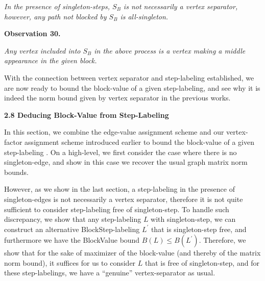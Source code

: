 \emph{In the presence of singleton-steps, $S_{B}$ is not necessarily a vertex separator, however, any path not blocked by $S_{B}$ is all-singleton.}\par







\par\medskip\noindent\textbf{
\textbf{Observation 30}\textbf{.}
}\par



\emph{Any vertex included into $S_{B}$ in the above process is a vertex making a middle appearance in the given block.}\par






With the connection between vertex separator and step-labeling established, we are now ready to bound the block-value of a given step-labeling, and see why it is indeed the norm bound given by vertex separator in the previous works.\par







\par\medskip\noindent\textbf{
2.8 Deducing Block-Value from Step-Labeling}\par




In this section, we combine the edge-value assignment scheme and our vertex-factor assignment scheme introduced earlier to bound the block-value of a given step-labeling
. On a high-level, we first consider the case where there is no singleton-edge, and show in this case we recover the usual graph matrix norm bounds.\par




However, as we show in the last section, a step-labeling in the presence of singleton-edges is not necessarily a vertex separator, therefore it is not quite sufficient to consider step-labeling free of singleton-step. To handle such discrepancy, we show that any step-labeling $L$ with singleton-step, we can construct an alternative BlockStep-labeling $L^{\prime}$ that is singleton-step free, and furthermore we have the BlockValue bound $B(L)\leq B(L^{\prime})$. Therefore, we show that for the sake of maximizer of the block-value (and thereby of the matrix norm bound), it suffices for us to consider $L$ that is free of singleton-step, and for these step-labelings, we have a “genuine” vertex-separator as usual.\par



